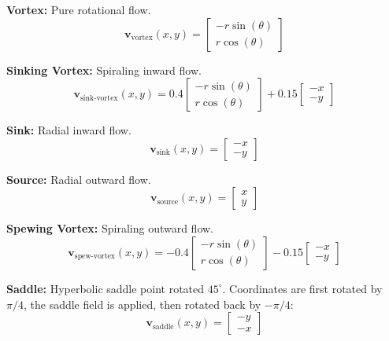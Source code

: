 \documentclass[lettersize,journal]{IEEEtran}
\begin{document}
\textbf{Vortex:} Pure rotational flow.
\begin{equation}
\mathbf{v}_{\text{vortex}}(x, y) = \begin{bmatrix} -r \sin(\theta) \\ r \cos(\theta) \end{bmatrix}
\end{equation}

\textbf{Sinking Vortex:} Spiraling inward flow.
\begin{equation}
\mathbf{v}_{\text{sink-vortex}}(x, y) = 0.4 \begin{bmatrix} -r \sin(\theta) \\ r \cos(\theta) \end{bmatrix} + 0.15 \begin{bmatrix} -x \\ -y \end{bmatrix}
\end{equation}

\textbf{Sink:} Radial inward flow.
\begin{equation}
\mathbf{v}_{\text{sink}}(x, y) = \begin{bmatrix} -x \\ -y \end{bmatrix}
\end{equation}

\textbf{Source:} Radial outward flow.
\begin{equation}
\mathbf{v}_{\text{source}}(x, y) = \begin{bmatrix} x \\ y \end{bmatrix}
\end{equation}

\textbf{Spewing Vortex:} Spiraling outward flow.
\begin{equation}
\mathbf{v}_{\text{spew-vortex}}(x, y) = -0.4 \begin{bmatrix} -r \sin(\theta) \\ r \cos(\theta) \end{bmatrix} - 0.15 \begin{bmatrix} -x \\ -y \end{bmatrix}
\end{equation}

\textbf{Saddle:} Hyperbolic saddle point rotated $45^\circ$. Coordinates are first rotated by $\pi/4$, the saddle field is applied, then rotated back by $-\pi/4$:
\begin{equation}
\mathbf{v}_{\text{saddle}}(x, y) = \begin{bmatrix} -y \\ -x \end{bmatrix}
\end{equation}
\end{document}
